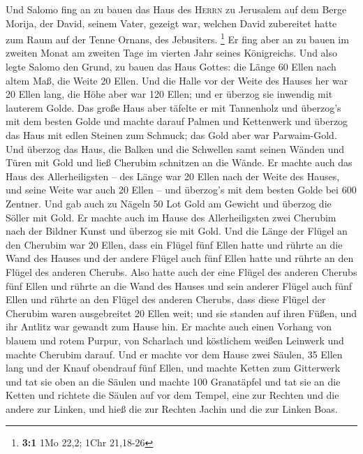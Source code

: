 Und Salomo fing an zu bauen das Haus des \textsc{Herrn}
zu Jerusalem auf dem Berge Morija, der David, seinem Vater, gezeigt war,
welchen David zubereitet hatte zum Raum auf der Tenne Ornans, des
Jebusiters. \footnote{\textbf{3:1} 1Mo 22,2; 1Chr 21,18-26}
 Er fing aber an zu bauen im zweiten Monat am zweiten Tage
im vierten Jahr seines Königreichs.  Und also legte Salomo
den Grund, zu bauen das Haus Gottes: die Länge 60 Ellen nach altem Maß,
die Weite 20 Ellen.  Und die Halle vor der Weite des
Hauses her war 20 Ellen lang, die Höhe aber war 120 Ellen; und er
überzog sie inwendig mit lauterem Golde.  Das große Haus
aber täfelte er mit Tannenholz und überzog's mit dem besten Golde und
machte darauf Palmen und Kettenwerk  und überzog das Haus
mit edlen Steinen zum Schmuck; das Gold aber war Parwaim-Gold.
 Und überzog das Haus, die Balken und die Schwellen samt
seinen Wänden und Türen mit Gold und ließ Cherubim schnitzen an die
Wände.  Er machte auch das Haus des Allerheiligsten -- des
Länge war 20 Ellen nach der Weite des Hauses, und seine Weite war auch
20 Ellen -- und überzog's mit dem besten Golde bei 600 Zentner.
 Und gab auch zu Nägeln 50 Lot Gold am Gewicht und überzog
die Söller mit Gold.  Er machte auch im Hause des
Allerheiligsten zwei Cherubim nach der Bildner Kunst und überzog sie mit
Gold.  Und die Länge der Flügel an den Cherubim war 20
Ellen, dass ein Flügel fünf Ellen hatte und rührte an die Wand des
Hauses und der andere Flügel auch fünf Ellen hatte und rührte an den
Flügel des anderen Cherubs.  Also hatte auch der eine
Flügel des anderen Cherubs fünf Ellen und rührte an die Wand des Hauses
und sein anderer Flügel auch fünf Ellen und rührte an den Flügel des
anderen Cherubs,  dass diese Flügel der Cherubim waren
ausgebreitet 20 Ellen weit; und sie standen auf ihren Füßen, und ihr
Antlitz war gewandt zum Hause hin.  Er machte auch einen
Vorhang von blauem und rotem Purpur, von Scharlach und köstlichem weißen
Leinwerk und machte Cherubim darauf.  Und er machte vor
dem Hause zwei Säulen, 35 Ellen lang und der Knauf obendrauf fünf Ellen,
 und machte Ketten zum Gitterwerk und tat sie oben an die
Säulen und machte 100 Granatäpfel und tat sie an die Ketten
 und richtete die Säulen auf vor dem Tempel, eine zur
Rechten und die andere zur Linken, und hieß die zur Rechten Jachin und
die zur Linken Boas.

